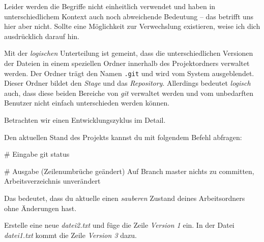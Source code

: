\documentclass[
  letterpaper,
  DIV=11]{scrreprt}
\newenvironment{Shaded}{\begin{snugshade}}{\end{snugshade}}
\newcommand{\CommentTok}[1]{\textcolor[rgb]{0.37,0.37,0.37}{#1}}
\newcommand{\ExtensionTok}[1]{\textcolor[rgb]{0.00,0.23,0.31}{#1}}
\newcommand{\FunctionTok}[1]{\textcolor[rgb]{0.28,0.35,0.67}{#1}}
\newcommand{\NormalTok}[1]{\textcolor[rgb]{0.00,0.23,0.31}{#1}}
\newcommand{\git}{\textit{git}\xspace}
\newcommand{\datei}[1]{\textit{#1}\xspace}
\begin{document}
Leider werden die Begriffe nicht einheitlich verwendet und haben in
unterschiedlichem Kontext auch noch abweichende Bedeutung -- das
betrifft uns hier aber nicht. Sollte eine Möglichkeit zur Verwechslung
existieren, weise ich dich ausdrücklich darauf hin.

Mit der \emph{logischen} Unterteilung ist gemeint, dass die
unterschiedlichen Versionen der Dateien in einem speziellen Ordner
innerhalb des Projektordners verwaltet werden. Der Ordner trägt den
Namen \texttt{.git} und wird vom System ausgeblendet. Dieser Ordner
bildet den \emph{Stage} und das \emph{Repository}. Allerdings bedeutet
\emph{logisch} auch, dass diese beiden Bereiche von \git verwaltet
werden und vom unbedarften Benutzer nicht einfach unterschieden werden
können.

Betrachten wir einen Entwicklungszyklus im Detail.

Den aktuellen Stand des Projekts kannst du mit folgendem Befehl
abfragen:

\begin{Shaded}
\begin{Highlighting}[]
\CommentTok{\# Eingabe}
\FunctionTok{git}\NormalTok{ status}

\CommentTok{\# Ausgabe (Zeilenumbrüche geändert)}
\ExtensionTok{Auf}\NormalTok{ Branch master}
\ExtensionTok{nichts}\NormalTok{ zu committen, }
\ExtensionTok{Arbeitsverzeichnis}\NormalTok{ unverändert}
\end{Highlighting}
\end{Shaded}

Das bedeutet, dass du aktuelle einen \emph{sauberen} Zustand deines
Arbeitsordners ohne Änderungen hast.

Erstelle eine neue \datei{datei2.txt} und füge die Zeile \emph{Version
1} ein. In der Datei \datei{datei1.txt} kommt die Zeile \emph{Version 3}
dazu.
\end{document}
